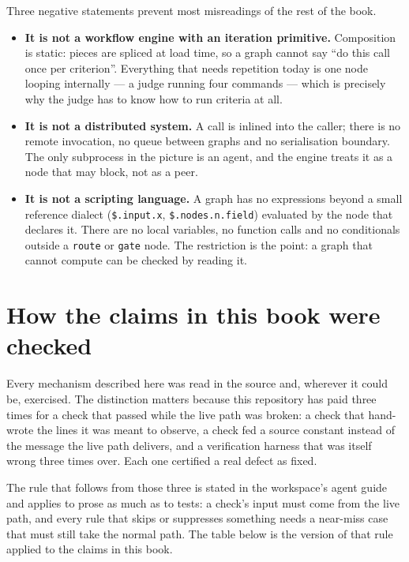 Three negative statements prevent most misreadings of the rest of the book.

\begin{itemize}
	\item \textbf{It is not a workflow engine with an iteration primitive.} Composition is static:
	pieces are spliced at load time, so a graph cannot say \enquote{do this call once per criterion}.
	Everything that needs repetition today is one node looping internally --- a judge running four
	commands --- which is precisely why the judge has to know how to run criteria at all.
	\item \textbf{It is not a distributed system.} A call is inlined into the caller; there is no
	remote invocation, no queue between graphs and no serialisation boundary. The only subprocess in
	the picture is an agent, and the engine treats it as a node that may block, not as a peer.
	\item \textbf{It is not a scripting language.} A graph has no expressions beyond a small
	reference dialect (\texttt{\$.input.x}, \texttt{\$.nodes.n.field}) evaluated by the node that
	declares it. There are no local variables, no function calls and no conditionals outside a
	\texttt{route} or \texttt{gate} node. The restriction is the point: a graph that cannot compute
	can be checked by reading it.
\end{itemize}

\section{How the claims in this book were checked}

Every mechanism described here was read in the source and, wherever it could be, exercised. The
distinction matters because this repository has paid three times for a check that passed while the
live path was broken: a check that hand-wrote the lines it was meant to observe, a check fed a
source constant instead of the message the live path delivers, and a verification harness that was
itself wrong three times over. Each one certified a real defect as fixed.

The rule that follows from those three is stated in the workspace's agent guide and applies to
prose as much as to tests: a check's input must come from the live path, and every rule that skips
or suppresses something needs a near-miss case that must still take the normal path. The table
below is the version of that rule applied to the claims in this book.

